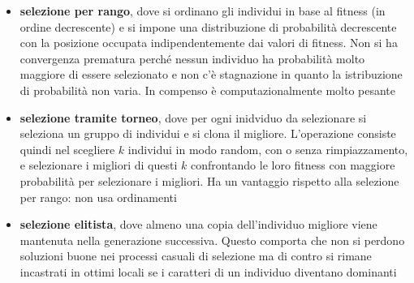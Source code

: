 \documentclass[a4paper,12pt, oneside]{book}
\begin{document}
\begin{itemize}
  \item \textbf{selezione per rango}, dove si ordinano gli individui
  in base al fitness (in ordine decrescente) e si impone una
  distribuzione di probabilità decrescente con la posizione occupata
  indipendentemente dai valori di fitness. Non si ha convergenza
  prematura perché nessun individuo ha probabilità molto maggiore di
  essere selezionato  e non c'è stagnazione in quanto la istribuzione
  di probabilità non varia. In compenso è computazionalmente molto
  pesante
  \item \textbf{selezione tramite torneo}, dove per ogni inidviduo da
  selezionare si seleziona un gruppo di individui e si clona il
  migliore. L'operazione consiste quindi nel scegliere $k$ individui in
  modo random, con o senza rimpiazzamento, e selezionare i migliori di
  questi $k$ confrontando le loro fitness con maggiore probabilità per
  selezionare i migliori. Ha un vantaggio rispetto alla selezione per
  rango: non usa ordinamenti
  \item \textbf{selezione elitista}, dove
  almeno una copia dell’individuo migliore viene mantenuta nella
  generazione successiva. Questo comporta che non si perdono soluzioni
  buone nei processi casuali di selezione ma di contro si rimane
  incastrati in ottimi locali se i caratteri di un individuo diventano
  dominanti 
\end{itemize}
\end{document}
